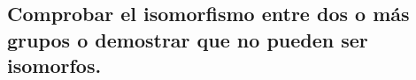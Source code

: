 \subsection{Comprobar el isomorfismo entre dos o más grupos o demostrar que no pueden ser isomorfos.}
